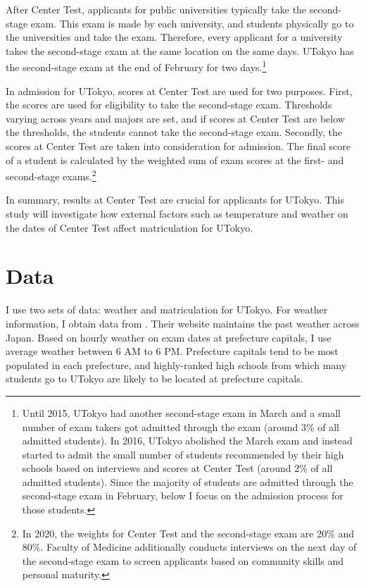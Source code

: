 \documentclass[12pt,letterpaper]{article}
\begin{document}
After Center Test, applicants for public universities typically take the second-stage exam.
This exam is made by each university, and students physically go to the universities and take the exam.
Therefore, every applicant for a university takes the second-stage exam at the same location on the same days.
UTokyo has the second-stage exam at the end of February for two days.\footnote{
  Until 2015, UTokyo had another second-stage exam in March and a small number of exam takers got admitted through the exam (around 3\% of all admitted students).
  In 2016, UTokyo abolished the March exam and instead started to admit the small number of students recommended by their high schools based on interviews and scores at Center Test (around 2\% of all admitted students).
  Since the majority of students are admitted through the second-stage exam in February, below I focus on the admission process for those students. 
}

In admission for UTokyo, scores at Center Test are used for two purposes.
First, the scores are used for eligibility to take the second-stage exam.
Thresholds varying across years and majors are set, and if scores at Center Test are below the thresholds, the students cannot take the second-stage exam.
Secondly, the scores at Center Test are taken into consideration for admission.
The final score of a student is calculated by the weighted sum of exam scores at the first- and second-stage exams.\footnote{
  In 2020, the weights for Center Test and the second-stage exam are 20\% and 80\%.
  Faculty of Medicine additionally conducts interviews on the next day of the second-stage exam to screen applicants based on community skills and personal maturity.
}

In summary, results at Center Test are crucial for applicants for UTokyo.
This study will investigate how external factors such as temperature and weather on the dates of Center Test affect matriculation for UTokyo.

\section{Data}\label{sec:data}

I use two sets of data: weather and matriculation for UTokyo.
For weather information, I obtain data from .
Their website maintains the past weather across Japan.
Based on hourly weather on exam dates at prefecture capitals, I use average weather between 6 AM to 6 PM.
Prefecture capitals tend to be most populated in each prefecture, and highly-ranked high schools from which many students go to UTokyo are likely to be located at prefecture capitals.
\end{document}
